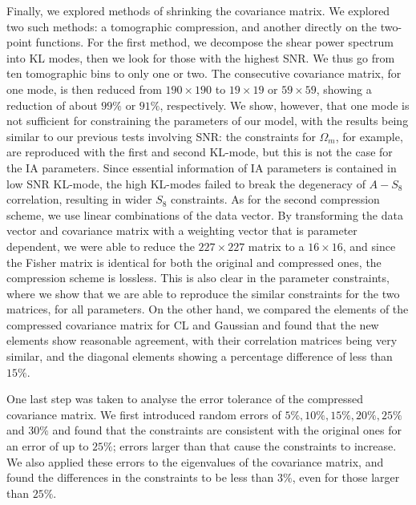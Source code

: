 \documentclass[twocolumn]{\docclass}
\begin{document}
	Finally, we explored methods of shrinking the covariance matrix. We explored two such methods: a tomographic compression, and another directly on the two-point functions. For the first method, we decompose the shear power spectrum into KL modes, then we look for those with the highest SNR. We thus go from ten tomographic bins to only one or two. The consecutive covariance matrix, for one mode, is then reduced from $190 \times 190$ to $19 \times 19$ or $59 \times 59$, showing a reduction of about $99\%$ or $91\%$, respectively. We show, however, that one mode is not sufficient for constraining the parameters of our model, with the results being similar to our previous tests involving SNR: the constraints for $\Omega_m$, for example, are reproduced with the first and second KL-mode, but this is not the case for the IA parameters. Since essential information of IA parameters is contained in low SNR KL-mode, the high KL-modes failed to break the degeneracy of $A-S_8$ correlation, resulting in wider $S_8$ constraints. As for the second compression scheme, we use linear combinations of the data vector. By transforming the data vector and covariance matrix with a weighting vector that is parameter dependent, we were able to reduce the $227 \times 227$ matrix to a $16 \times 16$, and since the Fisher matrix is identical for both the original and compressed ones, the compression scheme is lossless. This is also clear in the parameter constraints, where we show that we are able to reproduce the similar constraints for the two matrices, for all parameters. On the other hand, we compared the elements of the compressed covariance matrix for CL and Gaussian and found that the new elements show reasonable agreement, with their correlation matrices being very similar, and the diagonal elements showing a percentage difference of less than $15\%$.
	
	One last step was taken to analyse the error tolerance of the compressed covariance matrix. We first introduced random errors of $5\%, 10\%, 15\%, 20\%, 25\%$ and $30\%$ and found that the constraints are consistent with the original ones for an error of up to $25\%$; errors larger than that cause the constraints to increase. We also applied these errors to the eigenvalues of the covariance matrix, and found the differences in the constraints to be less than $3\%$, even for those larger than $25\%$.
	
	
\end{document}
